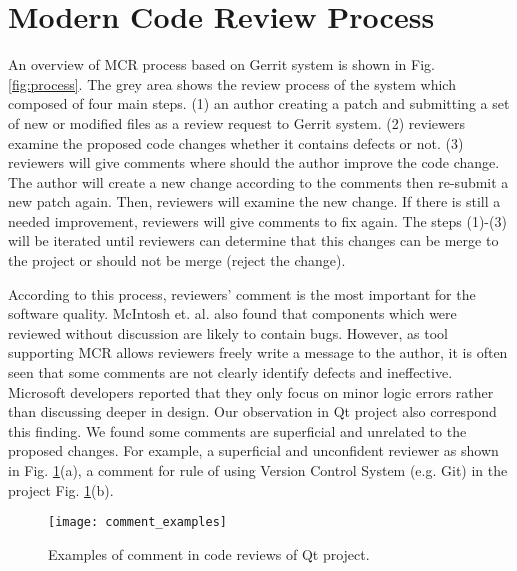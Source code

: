 
\section{Modern Code Review Process}

An overview of MCR process based on Gerrit system is shown in Fig. \ref{fig:process}. The grey area shows the review process of the system which composed of four main steps. (1) an author creating a patch and submitting a set of new or modified files as a review request to Gerrit system. (2) reviewers examine the proposed code changes whether it contains defects or not. (3) reviewers will give comments where should the author improve the code change. The author will create a new change according to the comments then re-submit a new patch again. Then, reviewers will examine the new change. If there is still a needed improvement, reviewers will give comments to fix again. The steps (1)-(3) will be iterated until reviewers can determine that this changes can be merge to the project or should not be merge (reject the change). 

According to this process, reviewers' comment is the most important for the software quality. McIntosh et. al. \cite{Mcintosh} also found that components which were reviewed without discussion are likely to contain bugs. However, as tool supporting MCR allows reviewers freely write a message to the author, it is often seen that some comments are not clearly identify defects and ineffective. Microsoft developers reported that they only focus on minor logic errors rather than discussing deeper in design\cite{Bacchelli2013a}. Our observation in Qt project also correspond this finding. We found some comments are superficial and unrelated to the proposed changes. For example, a superficial and unconfident reviewer as shown in Fig. \ref{fig:example}(a), a comment for rule of using Version Control System (e.g. Git) in the project Fig. \ref{fig:example}(b). 

\begin{figure}[!t]
\centering
\texttt{[image: comment\_examples]}
\caption{Examples of comment in code reviews of Qt project.}
\label{fig:example}
\end{figure}

